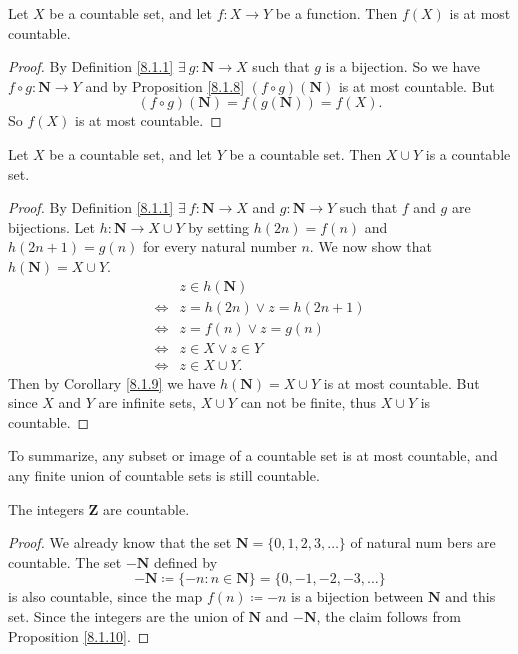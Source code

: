\begin{corollary}\label{8.1.9}
Let \(X\) be a countable set, and let \(f : X \to Y\) be a function.
Then \(f(X)\) is at most countable.
\end{corollary}

\begin{proof}
By Definition \ref{8.1.1} \(\exists\ g : \mathbf{N} \to X\) such that \(g\) is a bijection.
So we have \(f \circ g : \mathbf{N} \to Y\) and by Proposition \ref{8.1.8} \((f \circ g)(\mathbf{N})\) is at most countable.
But
\[
    (f \circ g)(\mathbf{N}) = f(g(\mathbf{N})) = f(X).
\]
So \(f(X)\) is at most countable.
\end{proof}

\begin{proposition}\label{8.1.10}
Let \(X\) be a countable set, and let \(Y\) be a countable set.
Then \(X \cup Y\) is a countable set.
\end{proposition}

\begin{proof}
By Definition \ref{8.1.1} \(\exists\ f : \mathbf{N} \to X\) and \(g : \mathbf{N} \to Y\) such that \(f\) and \(g\) are bijections.
Let \(h : \mathbf{N} \to X \cup Y\) by setting \(h(2n) = f(n)\) and \(h(2n + 1) = g(n)\) for every natural number \(n\).
We now show that \(h(\mathbf{N}) = X \cup Y\).
\begin{align*}
& z \in h(\mathbf{N}) \\
\iff & z = h(2n) \lor z = h(2n + 1) \\
\iff & z = f(n) \lor z = g(n) \\
\iff & z \in X \lor z \in Y \\
\iff & z \in X \cup Y.
\end{align*}
Then by Corollary \ref{8.1.9} we have \(h(\mathbf{N}) = X \cup Y\) is at most countable.
But since \(X\) and \(Y\) are infinite sets, \(X \cup Y\) can not be finite, thus \(X \cup Y\) is countable.
\end{proof}

\begin{note}
To summarize, any subset or image of a countable set is at most countable, and any finite union of countable sets is still countable.
\end{note}

\begin{corollary}\label{8.1.11}
The integers \(\mathbf{Z}\) are countable.
\end{corollary}

\begin{proof}
We already know that the set \(\mathbf{N} = \{0, 1, 2, 3, \dots\}\) of natural num bers are countable.
The set \(-\mathbf{N}\) defined by
\[
    -\mathbf{N} \coloneqq \{-n : n \in \mathbf{N}\} = \{0, -1, -2, -3, \dots\}
\]
is also countable, since the map \(f(n) \coloneqq -n\) is a bijection between \(\mathbf{N}\) and this set.
Since the integers are the union of \(\mathbf{N}\) and \(-\mathbf{N}\), the claim follows from Proposition \ref{8.1.10}.
\end{proof}

